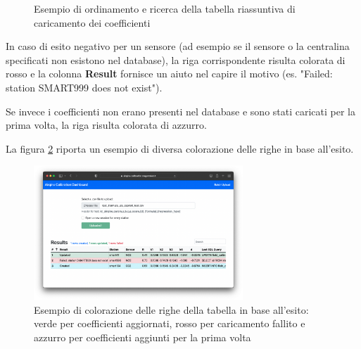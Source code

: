 \begin{figure}[H]%
    \centering
    \captionsetup{justification=centering}
    \caption{Esempio di ordinamento e ricerca della tabella riassuntiva di caricamento dei coefficienti}%
    \label{fig:interfaccia-4-5}%
\end{figure}

In caso di esito negativo per un sensore (ad esempio se il sensore o la centralina specificati non esistono nel database), la riga corrispondente risulta colorata di rosso e la colonna \textbf{Result} fornisce un aiuto nel capire il motivo (es. "Failed: station SMART999 does not exist").

Se invece i coefficienti non erano presenti nel database e sono stati caricati per la prima volta, la riga risulta colorata di azzurro. 

La figura \ref{fig:interfaccia-7} riporta un esempio di diversa colorazione delle righe in base all'esito.

\begin{figure}[H]
\centering
\includegraphics[width=0.70\textwidth,height=\textheight,keepaspectratio]{img/interfaccia_7}
\caption{Esempio di colorazione delle righe della tabella in base all'esito: verde per coefficienti aggiornati, rosso per caricamento fallito e azzurro per coefficienti aggiunti per la prima volta}
\label{fig:interfaccia-7}
\end{figure}

